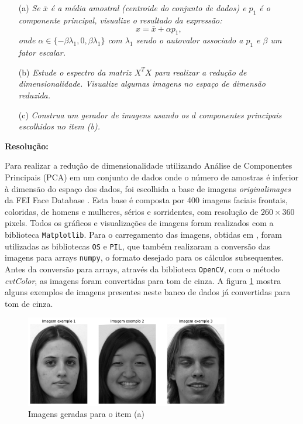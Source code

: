 \documentclass[a4paper, 11pt]{article}
\begin{document}
\begin{enumerate}
    \item[(a)] \textit{Se $\bar{x}$ é a média amostral (centroide do conjunto de dados) e $p_1$ é o componente principal, visualize o resultado da expressão:}
    \[
    x = \bar{x} + \alpha p_1,
    \]
    \textit{onde $\alpha \in \{-\beta \lambda_1, 0, \beta \lambda_1\}$ com $\lambda_1$ sendo o autovalor associado a $p_1$ e $\beta$ um fator escalar.}
    
    \item[(b)] \textit{Estude o espectro da matriz $X^T X$ para realizar a redução de dimensionalidade. Visualize algumas imagens no espaço de dimensão reduzida.}
    
    \item[(c)] \textit{Construa um gerador de imagens usando os $d$ componentes principais escolhidos no item (b).}
\end{enumerate}

\textbf{Resolução:}

Para realizar a redução de dimensionalidade utilizando Análise de Componentes Principais (PCA) em um conjunto de dados onde o número de amostras é inferior à dimensão do espaço dos dados, foi escolhida a base de imagens \textit{originalimages} da FEI Face Database \cite{FEI}. Esta base é composta por 400 imagens faciais frontais, coloridas, de homens e mulheres, sérios e sorridentes, com resolução de $260 \times 360$ pixels. Todos os gráficos e visualizações de imagens foram realizados com a biblioteca \texttt{Matplotlib}. Para o carregamento das imagens, obtidas em \cite{FEI}, foram utilizadas as bibliotecas \texttt{OS} e \texttt{PIL}, que também realizaram a conversão das imagens para arrays \texttt{numpy}, o formato desejado para os cálculos subsequentes. Antes da conversão para arrays, através da biblioteca \texttt{OpenCV}, com o método \textit{cvtColor}, as imagens foram convertidas para tom de cinza. A figura \ref{fig:FEI} mostra alguns exemplos de imagens presentes neste banco de dados já convertidas para tom de cinza.

\begin{figure}[H]
    \centering 
    \includegraphics[width=0.8\textwidth]{imgs/FEI.png}
    \caption{Imagens geradas para o item (a)}
    \label{fig:FEI} %
\end{figure}
\end{document}
